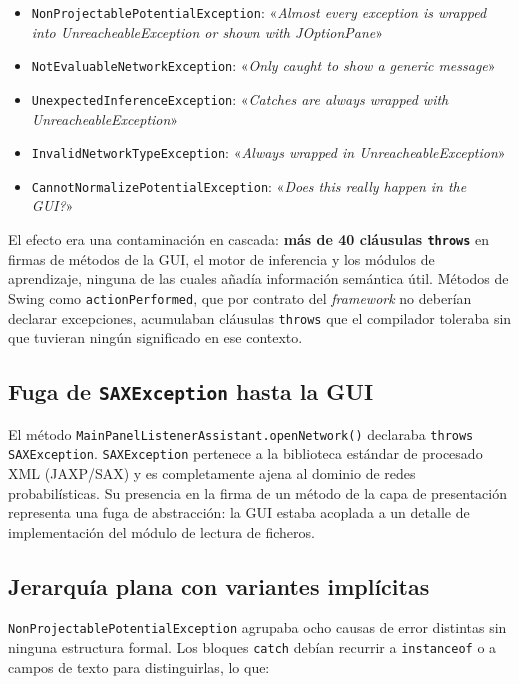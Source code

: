 \documentclass[12pt,a4paper]{article}
\begin{document}
\begin{itemize}
  \item \texttt{NonProjectablePotentialException}: «\textit{Almost every
    exception is wrapped into UnreacheableException or shown with JOptionPane}»
  \item \texttt{NotEvaluableNetworkException}: «\textit{Only caught to show a
    generic message}»
  \item \texttt{UnexpectedInferenceException}: «\textit{Catches are always
    wrapped with UnreacheableException}»
  \item \texttt{InvalidNetworkTypeException}: «\textit{Always wrapped in
    UnreacheableException}»
  \item \texttt{CannotNormalizePotentialException}: «\textit{Does this really
    happen in the GUI?}»
\end{itemize}

El efecto era una contaminación en cascada: \textbf{más de 40 cláusulas
\texttt{throws}} en firmas de métodos de la GUI, el motor de inferencia y los
módulos de aprendizaje, ninguna de las cuales añadía información semántica útil.
Métodos de Swing como \texttt{actionPerformed}, que por contrato del
\textit{framework} no deberían declarar excepciones, acumulaban cláusulas
\texttt{throws} que el compilador toleraba sin que tuvieran ningún significado
en ese contexto.

\subsection{Fuga de \texttt{SAXException} hasta la GUI}
\label{sec:prob-sax}

El método \texttt{MainPanelListenerAssistant.openNetwork()} declaraba
\texttt{throws SAXException}. \texttt{SAXException} pertenece a la biblioteca
estándar de procesado XML (JAXP/SAX) y es completamente ajena al dominio de
redes probabilísticas. Su presencia en la firma de un método de la capa de
presentación representa una fuga de abstracción: la GUI estaba acoplada a un
detalle de implementación del módulo de lectura de ficheros.

\subsection{Jerarquía plana con variantes implícitas}
\label{sec:prob-plana}

\texttt{NonProjectablePotentialException} agrupaba ocho causas de error distintas
sin ninguna estructura formal. Los bloques \texttt{catch} debían recurrir a
\texttt{instanceof} o a campos de texto para distinguirlas, lo que:
\end{document}
